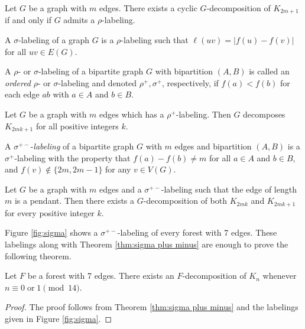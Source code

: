 \documentclass{dmgt}
\begin{document}
\begin{theorem}\label{thm:Rhosa}  
Let $G$ be a graph with $m$ edges.  There exists a cyclic $G$-decomposition of $K_{2m+1}$ if and only if $G$ admits a $\rho$-labeling.
\end{theorem}

\begin{dnt} \label{def:sigma} 
A $\sigma$-labeling of a graph $G$ is a $\rho$-labeling such that $\ell(uv) = |f(u) - f(v)|$ for all $uv \in E(G).$
\end{dnt}

\begin{dnt} \label{def:rho and sigma ordered def} 
A $\rho$- or $\sigma$-labeling of a bipartite graph $G$ with bipartition $(A,B)$ is called an \emph{ordered} $\rho$- or $\sigma$-labeling and denoted $\rho^+,\sigma^+$, respectively, if $f(a) < f(b)$ for each edge $ab$ with $a \in A$ and $b \in B$.
\end{dnt}

\begin{theorem} \label{thm:rho plus} 
Let $G$ be a graph with $m$ edges which has a $\rho^+$-labeling.  Then $G$ decomposes $K_{2mk+1}$ for all positive integers $k$.
\end{theorem}

\begin{dnt} \label{def:sigma plus minus} 
A $\sigma^{+-}$-\emph{labeling} of a bipartite graph $G$ with $m$ edges and bipartition $(A,B)$ is a $\sigma^+$-labeling with the property that $f(a) - f(b) \neq m$ for all $a \in A$ and $b \in B$, and $f(v) \not\in \{2m,2m-1\}$ for any $v\in V(G)$.
\end{dnt}

\begin{theorem} \label{thm:sigma plus minus} 
Let $G$ be a graph with $m$ edges and a $\sigma^{+-}$-labeling such that the edge of length $m$ is a pendant. Then there exists a $G$-decomposition of both $K_{2mk}$ and $K_{2mk+1}$ for every positive integer $k$.
\end{theorem}

Figure \ref{fig:sigma} shows a $\sigma^{+-}$-labeling of every forest with 7 edges. These labelings along with Theorem \ref{thm:sigma plus minus} are enough to prove the following theorem. 
\begin{theorem}\label{thm:0 or 1 mod 14}
    Let $F$ be a forest with 7 edges. There exists an $F$-decomposition of $K_n$ whenever $n \equiv 0 \; \textrm{or} \; 1 \pmod{14}.$
\end{theorem}
\begin{proof}
    The proof follows from Theorem \ref{thm:sigma plus minus} and the labelings given in Figure \ref{fig:sigma}.
\end{proof}
\end{document}
